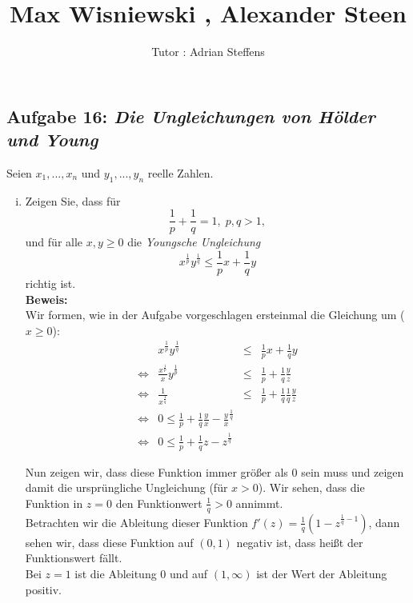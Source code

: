 \documentclass[11pt,a4paper,ngerman]{article}
\date{}
\title{Max Wisniewski , Alexander Steen}
\author{Tutor : Adrian Steffens}
\begin{document}

\maketitle
\thispagestyle{fancy}

\subsection*{Aufgabe 16: \mdseries\itshape Die Ungleichungen von Hölder und Young}
Seien $x_1,...,x_n$ und $y_1,...,y_n$ reelle Zahlen.

\begin{enumerate}[(i)]
	\item Zeigen Sie, dass für
		$$
			\frac{1}{p} + \frac{1}{q} = 1, \; p,q>1,
		$$
		und für alle $x,y\geq 0$ die \emph{Youngsche Ungleichung}
		$$
			x^{\frac{1}{p}} y^{\frac{1}{q}} \leq \frac{1}{p} x + \frac{1}{q} y
		$$
		richtig ist.\\
	\textbf{Beweis:}\\
		Wir formen, wie in der Aufgabe vorgeschlagen ersteinmal die Gleichung um ($x \geq 0$):
        $$\begin{array}{crcl}
            & x^{\frac{1}{p}} y^{\frac{1}{q}} &\leq& \frac{1}{p} x + \frac{1}{q} y\\
            \Leftrightarrow & \frac{x^{\frac{1}{p}}}{x} y^{\frac{1}{p}} & \leq & \frac{1}{p} + \frac{1}{q} \frac{y}{z}\\
            \Leftrightarrow & \frac{1}{x^{\frac{1}{q}}} & \leq & \frac{1}{p} + \frac{1}{q} \frac{1}{q} \frac{y}{z}\\
            \Leftrightarrow & 0 \leq \frac{1}{p} + \frac{1}{q} \frac{y}{x} - \frac{y}{x}^{\frac{1}{q}}\\
            \Leftrightarrow & 0 \leq \frac{1}{p} + \frac{1}{q} z - z^{\frac{1}{q}}
        \end{array}$$

        Nun zeigen wir, dass diese Funktion immer größer als 0 sein muss und zeigen damit die ursprüngliche
        Ungleichung (für $x>0$).
        Wir sehen, dass die Funktion in $z=0$ den Funktionwert $\frac{1}{q} > 0$ annimmt.\\
        Betrachten wir die Ableitung dieser Funktion $f'(z) = \frac{1}{q} \left( 1 - z^{\frac{1}{q} -1 } \right)$, dann sehen wir, dass diese Funktion auf $(0,1)$ negativ ist, dass heißt der Funktionswert fällt.\\
        Bei $z=1$ ist die Ableitung $0$ und auf $(1,\infty)$ ist der Wert der Ableitung positiv.\\
        

\end{enumerate}
\end{document}
